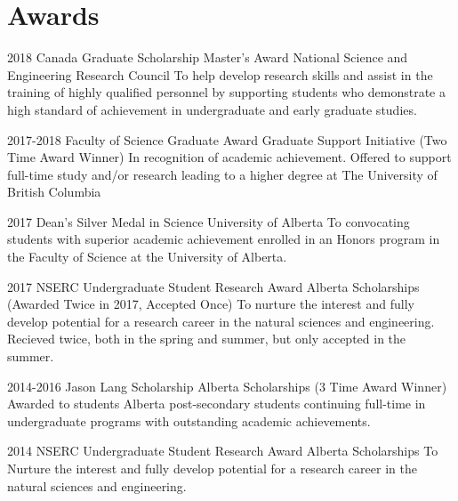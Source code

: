 \documentclass{friggeri-cv}
\begin{document}

\pagebreak[4]
\section{Awards}

\begin{entrylist}

\entry
{2018}
{Canada Graduate Scholarship Master's Award}
{National Science and Engineering Research Council}
{To help develop research skills and assist in the training of highly qualified personnel by supporting students who demonstrate a high standard of achievement in undergraduate and early graduate studies.}

\entry
{2017-2018}
{Faculty of Science Graduate Award}
{Graduate Support Initiative}
{(Two Time Award Winner) In recognition of academic achievement. Offered to support full-time study and/or research leading to a higher degree at The University of British Columbia}

\entry
{2017}
{Dean's Silver Medal in Science}
{University of Alberta}
{To convocating students with superior academic achievement enrolled in an Honors program in the Faculty of Science at the University of Alberta.}


\entry
{2017}
{NSERC Undergraduate Student Research Award}
{Alberta Scholarships}
{(Awarded Twice in 2017, Accepted Once) To nurture the interest and fully develop potential for a research career in the natural sciences and engineering. Recieved twice, both in the spring and summer, but only accepted in the summer.}

\entry
{2014-2016}
{Jason Lang Scholarship}
{Alberta Scholarships}
{(3 Time Award Winner) Awarded to students Alberta post-secondary students continuing full-time in undergraduate programs with outstanding academic achievements.}


\entry
{2014}
{NSERC Undergraduate Student Research Award}
{Alberta Scholarships}
{To Nurture the interest and fully develop potential for a research career in the natural sciences and engineering.}



\end{entrylist}
\end{document}
